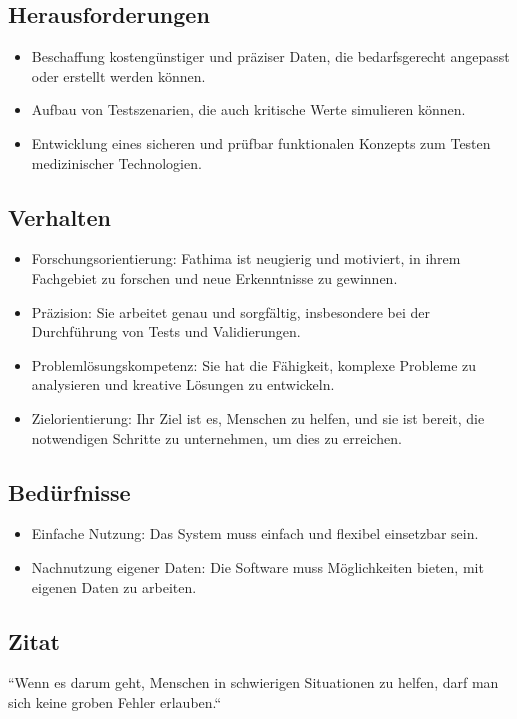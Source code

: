 \subsection*{Herausforderungen}
\begin{itemize}
    \item Beschaffung kostengünstiger und präziser Daten, die bedarfsgerecht angepasst oder erstellt werden können.
    \item Aufbau von Testszenarien, die auch kritische Werte simulieren können.
    \item Entwicklung eines sicheren und prüfbar funktionalen Konzepts zum Testen medizinischer Technologien.
\end{itemize}

\subsection*{Verhalten}
\begin{itemize}
    \item Forschungsorientierung: Fathima ist neugierig und motiviert, in ihrem Fachgebiet zu forschen und neue Erkenntnisse zu gewinnen.
    \item Präzision: Sie arbeitet genau und sorgfältig, insbesondere bei der Durchführung von Tests und Validierungen.
    \item Problemlösungskompetenz: Sie hat die Fähigkeit, komplexe Probleme zu analysieren und kreative Lösungen zu entwickeln.
    \item Zielorientierung: Ihr Ziel ist es, Menschen zu helfen, und sie ist bereit, die notwendigen Schritte zu unternehmen, um dies zu erreichen.
\end{itemize}

\subsection*{Bedürfnisse}
\begin{itemize}
    \item Einfache Nutzung: Das System muss einfach und flexibel einsetzbar sein.
    \item Nachnutzung eigener Daten: Die Software muss Möglichkeiten bieten, mit eigenen Daten zu arbeiten.
\end{itemize}

\subsection*{Zitat}
``Wenn es darum geht, Menschen in schwierigen Situationen zu helfen, darf man sich keine groben Fehler erlauben.``

